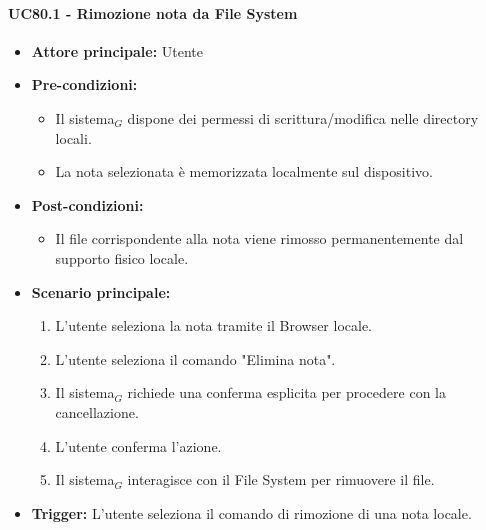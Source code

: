 \documentclass[a4paper, 10pt]{article}
\begin{document}
\paragraph{UC80.1 - Rimozione nota da File System}
\hypertarget{uc:80.1}{}
\begin{itemize}
    \item \textbf{Attore principale:} Utente
    \item \textbf{Pre-condizioni:} 
        \begin{itemize}
            \item Il sistema$_G$ dispone dei permessi di scrittura/modifica nelle directory locali.
            \item La nota selezionata è memorizzata localmente sul dispositivo.
        \end{itemize}
    \item \textbf{Post-condizioni:} 
        \begin{itemize}
            \item Il file corrispondente alla nota viene rimosso permanentemente dal supporto fisico locale.
        \end{itemize}
    \item \textbf{Scenario principale:}
        \begin{enumerate}
            \item L'utente seleziona la nota tramite il Browser locale.
            \item L'utente seleziona il comando "Elimina nota".
            \item Il sistema$_G$ richiede una conferma esplicita per procedere con la cancellazione.
            \item L'utente conferma l'azione.
            \item Il sistema$_G$ interagisce con il File System per rimuovere il file.
        \end{enumerate}
    \item \textbf{Trigger:} L'utente seleziona il comando di rimozione di una nota locale.
\end{itemize}
\end{document}
